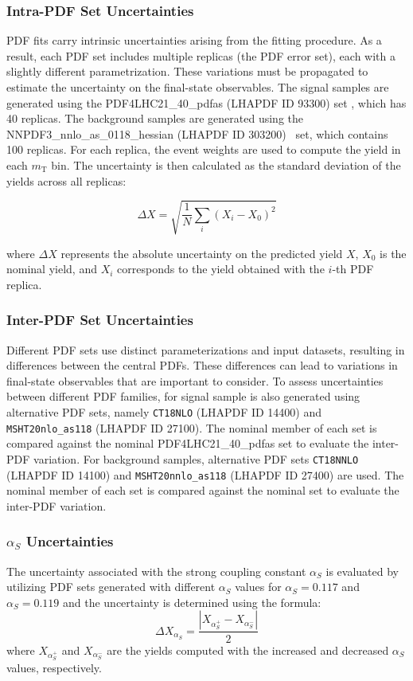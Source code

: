 \subsubsection{Intra-PDF Set Uncertainties}
PDF fits carry intrinsic uncertainties arising from the fitting procedure. As a result, each PDF set includes multiple replicas (the PDF error set), each with a slightly different parametrization. These variations must be propagated to estimate the uncertainty on the final-state observables.
The signal samples are generated using the PDF4LHC21\_40\_pdfas (LHAPDF ID 93300) set \cite{PDF4LHC}, which has 40 replicas. The background samples are generated using the NNPDF3\_nnlo\_as\_0118\_hessian (LHAPDF ID 303200)~\cite{nnpdf} set, which contains 100 replicas. For each replica, the event weights are used to compute the yield in each $m_{\mathrm{T}}$ bin. The uncertainty is then calculated as the standard deviation of the yields across all replicas:

\begin{equation}
    \Delta X = \sqrt{\frac{1}{N} \sum_i \left( X_i - X_0 \right)^2 }
\end{equation}

where $\Delta X$ represents the absolute uncertainty on the predicted yield $X$, $X_0$ is the nominal yield, and $X_i$ corresponds to the yield obtained with the $i$-th PDF replica.\\

\subsubsection{Inter-PDF Set Uncertainties}
Different PDF sets use distinct parameterizations and input datasets, resulting in differences between the central PDFs. These differences can lead to variations in final-state observables that are important to consider.
To assess uncertainties between different PDF families, for signal sample is also generated using alternative PDF sets, namely \texttt{CT18NLO} (LHAPDF ID 14400) and \texttt{MSHT20nlo\_as118} (LHAPDF ID 27100). The nominal member of each set is compared against the nominal PDF4LHC21\_40\_pdfas set to evaluate the inter-PDF variation. For background samples, alternative PDF sets \texttt{CT18NNLO} (LHAPDF ID 14100) and \texttt{MSHT20nnlo\_as118} (LHAPDF ID 27400) are used. The nominal member of each set is compared against the nominal set to evaluate the inter-PDF variation.
\subsubsection{$\alpha_{S}$ Uncertainties}
The uncertainty associated with the strong coupling constant $\alpha_S$ is evaluated by utilizing PDF sets generated with different $\alpha_S$ values for $\alpha_S = 0.117$ and $\alpha_S = 0.119$ and the uncertainty is determined using the formula:
\begin{equation}
    \Delta X_{\alpha_S} = \frac{\left| X_{\alpha_S^+} - X_{\alpha_S^-} \right|}{2}
\end{equation}
where $X_{\alpha_S^+}$ and $X_{\alpha_S^-}$ are the yields computed with the increased and decreased $\alpha_S$ values, respectively.


